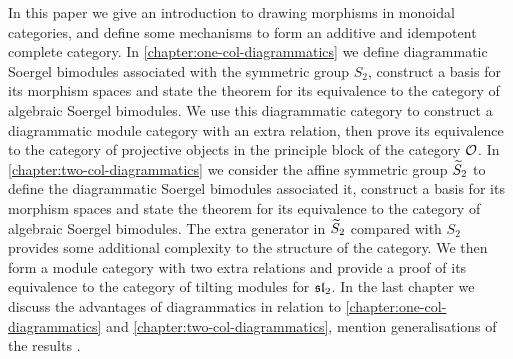 




In this paper we give an introduction to drawing morphisms in monoidal categories,  and define some mechanisms to form an additive and idempotent complete category. In \autoref{chapter:one-col-diagrammatics} we define diagrammatic Soergel bimodules associated with the symmetric group $S_2$, construct a basis for its morphism spaces and state the theorem for its equivalence to the category of algebraic Soergel bimodules. We use this diagrammatic category to construct a diagrammatic module category with an extra relation, then prove its equivalence to the category of projective objects in the principle block of the category $\mathcal{O}$. In \autoref{chapter:two-col-diagrammatics} we consider the affine symmetric group $\widetilde{S}_2$ to define the diagrammatic Soergel bimodules associated it, construct a basis for its morphism spaces and state the theorem for its equivalence to the category of algebraic Soergel bimodules. The extra generator in $\widetilde{S}_2$ compared with $S_2$ provides some additional complexity to the structure of the category. We then form a module category with two extra relations and provide a proof of its equivalence to the category of tilting modules for $\operatorname{\mathfrak{sl}}_2$. In the last chapter we discuss the advantages  of diagrammatics in relation to \autoref{chapter:one-col-diagrammatics} and \autoref{chapter:two-col-diagrammatics}, mention generalisations of the results .

